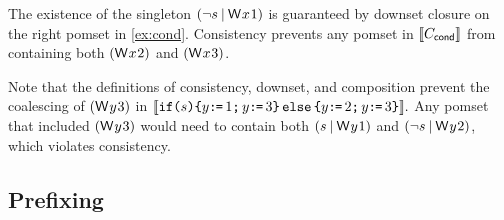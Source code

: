 The existence of the singleton $(\lnot s \mathbin{\mid}\DW{x}{1})$ is
guaranteed by downset closure on the right pomset in \eqref{ex:cond}.
Consistency prevents any pomset in $\llbracket C_{\mathsf{cond}}\rrbracket$ from
containing both $(\DW{x}{2})$ and $(\DW{x}{3})$.

Note that the definitions of consistency, downset, and composition prevent
the coalescing of $(\DW{y}{3})$ in
\begin{math}
  \llbracket\texttt{if}\allowbreak\texttt{(}s\texttt{)}\allowbreak\texttt{\{} y\texttt{:}\mkern-1mu\texttt{=}\, 1 \texttt{;}\,\allowbreak y\texttt{:}\mkern-1mu\texttt{=}\, 3 \texttt{\}}\,\allowbreak\texttt{else}\allowbreak\,\texttt{\{} y\texttt{:}\mkern-1mu\texttt{=}\, 2 \texttt{;}\,\allowbreak y\texttt{:}\mkern-1mu\texttt{=}\, 3 \texttt{\}}\rrbracket.
\end{math}
Any pomset that included $(\DW{y}{3})$ would need to contain both $(s
\mathbin{\mid}\DW{y}{1})$ and $(\lnot s \mathbin{\mid}\DW{y}{2})$, which
violates consistency.



\subsection{Prefixing} %
\label{sec:pop}

